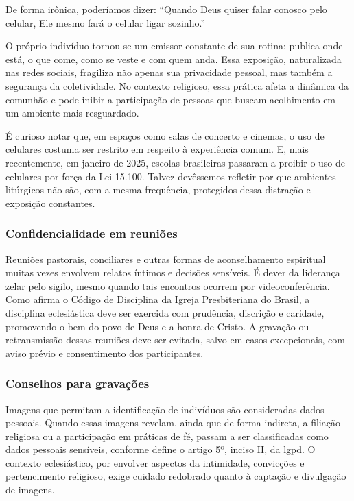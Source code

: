 De forma irônica, poderíamos dizer: ``Quando Deus quiser falar conosco pelo celular, Ele mesmo fará o celular ligar sozinho.''

O próprio indivíduo tornou-se um emissor constante de sua rotina: publica onde está, o que come, como se veste e com quem anda. Essa exposição, naturalizada nas redes sociais, fragiliza não apenas sua privacidade pessoal, mas também a segurança da coletividade. No contexto religioso, essa prática afeta a dinâmica da comunhão e pode inibir a participação de pessoas que buscam acolhimento em um ambiente mais resguardado.

É curioso notar que, em espaços como salas de concerto e cinemas, o uso de celulares costuma ser restrito em respeito à experiência comum. E, mais recentemente, em janeiro de 2025, escolas brasileiras passaram a proibir o uso de celulares por força da Lei 15.100\cite{lei15100_2025}. Talvez devêssemos refletir por que ambientes litúrgicos não são, com a mesma frequência, protegidos dessa distração e exposição constantes.

\subsubsection{Confidencialidade em reuniões}

Reuniões pastorais, conciliares e outras formas de aconselhamento espiritual muitas vezes envolvem relatos íntimos e decisões sensíveis. É dever da liderança zelar pelo sigilo, mesmo quando tais encontros ocorrem por videoconferência. Como afirma o Código de Disciplina da Igreja Presbiteriana do Brasil, a disciplina eclesiástica deve ser exercida com prudência, discrição e caridade, promovendo o bem do povo de Deus e a honra de Cristo. A gravação ou retransmissão dessas reuniões deve ser evitada, salvo em casos excepcionais, com aviso prévio e consentimento dos participantes.

\subsubsection{Conselhos para gravações}


Imagens que permitam a identificação de indivíduos são consideradas dados pessoais. Quando essas imagens revelam, ainda que de forma indireta, a filiação religiosa ou a participação em práticas de fé, passam a ser classificadas como dados pessoais sensíveis, conforme define o artigo 5º, inciso II, da \gls{lgpd}. O contexto eclesiástico, por envolver aspectos da intimidade, convicções e pertencimento religioso, exige cuidado redobrado quanto à captação e divulgação de imagens.

